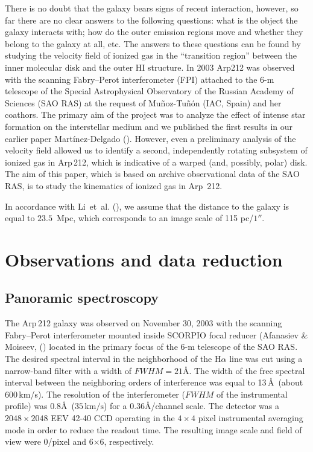 \documentclass{ab}
\newcommand{\km}{\,\mbox{km/s}}
\begin{document}
There is no doubt that the galaxy bears signs of recent
interaction, however, so far there are no clear answers to the
following questions: what is the object the galaxy interacts with;
how do the outer emission regions move and whether they belong to
the galaxy at all, etc.  The answers to these questions can be
found by studying the velocity field of ionized gas in the
``transition region'' between the inner molecular disk and the
outer HI structure. In 2003   Arp212 was observed with the
scanning Fabry--Perot interferometer (FPI) attached to the 6-m
telescope of the Special Astrophysical Observatory of the Russian
Academy of Sciences (SAO RAS) at the request of
Mu\~{n}oz-Tu\~{n}\'{o}n (IAC, Spain) and her coathors. The primary
aim of the project was to analyze the effect of intense star
formation on the interstellar medium and we published the first
results in our earlier paper Mart\'{i}nez-Delgado (\cite{delgado:Moiseev_n}). However, even a preliminary analysis of the velocity field allowed us to
identify a second, independently rotating subsystem of ionized gas
in  Arp\,212, which is indicative of a warped (and, possibly,
polar) disk. The aim of this paper, which is based on archive
observational data of the SAO RAS, is to study the kinematics of
ionized gas in Arp~212.

In accordance with Li~et~al. (\cite{li:Moiseev_n}), we assume that
the distance to the galaxy is equal to  $23.5$~Mpc, which
corresponds to an image scale of 115 pc/$1''$.

\section{Observations and data reduction}
\label{obs:Moiseev_n}

\subsection{Panoramic spectroscopy}

The Arp\,212 galaxy was observed on November 30, 2003 with the
scanning Fabry--Perot interferometer mounted inside SCORPIO focal
reducer (Afanasiev \& Moiseev, (\cite{afanas05:Moiseev_n}) located in the
primary focus of the 6-m telescope of the SAO RAS. The desired
spectral interval in the neighborhood of the H$\alpha$ line was
cut using a narrow-band filter with a width of
\mbox{$FWHM=21$\AA}. The width of the free spectral interval
between the neighboring orders of interference was equal to
13\,\AA\, (about 600\km). The resolution of the interferometer
($FWHM$ of the instrumental profile) was $0.8$\AA\, ($35\km$) for
a  0.36\AA/channel scale. The detector was a $2048\times2048$ EEV
42-40 CCD operating in the $4\times4$ pixel instrumental averaging
mode in order to reduce the readout time. The resulting image
scale and field of view were 0/pixel and 6$\times$6,
respectively.
\end{document}
